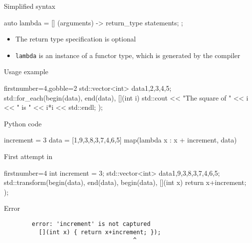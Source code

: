 \begin{frame}[fragile]
  \begin{block}{Simplified syntax}
    \begin{cppcode*}{}
      auto lambda = [] (arguments) -> return_type {
        statements;
      };
    \end{cppcode*}
    \begin{itemize}
    \item The return type specification is optional
    \item \texttt{lambda} is an instance of a functor type, which is generated by the compiler
    \end{itemize}
  \end{block}
  \begin{exampleblock}{Usage example}
    \begin{cppcode*}{firstnumber=4,gobble=2}
      std::vector<int> data{1,2,3,4,5};
      std::for_each(begin(data), end(data), [](int i) {
        std::cout << "The square of " << i
                  << " is " << i*i << std::endl;
      });
    \end{cppcode*}
  \end{exampleblock}
\end{frame}


\begin{frame}[fragile]
  \begin{block}{Python code}
    \begin{pythoncode*}{}
      increment = 3
      data = [1,9,3,8,3,7,4,6,5]
      map(lambda x : x + increment, data)
    \end{pythoncode*}
  \end{block}
  \pause
  \begin{block}{First attempt in \cpp}
    \begin{cppcode*}{firstnumber=4}
      int increment = 3;
      std::vector<int> data{1,9,3,8,3,7,4,6,5};
      std::transform(begin(data), end(data), begin(data),
                     [](int x) { return x+increment; });
    \end{cppcode*}
  \end{block}
  \pause
  \begin{alertblock}{Error}
    \begin{verbatim}
        error: 'increment' is not captured
          [](int x) { return x+increment; });
                                     ^
    \end{verbatim}
  \end{alertblock}
\end{frame}


